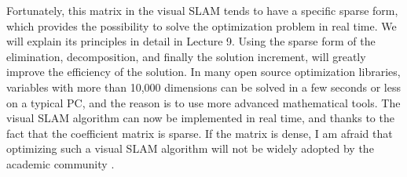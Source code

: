 Fortunately, this matrix in the visual SLAM tends to have a specific sparse form, which provides the possibility to solve the optimization problem in real time. We will explain its principles in detail in Lecture 9. Using the sparse form of the elimination, decomposition, and finally the solution increment, will greatly improve the efficiency of the solution. In many open source optimization libraries, variables with more than 10,000 dimensions can be solved in a few seconds or less on a typical PC, and the reason is to use more advanced mathematical tools. The visual SLAM algorithm can now be implemented in real time, and thanks to the fact that the coefficient matrix is sparse. If the matrix is dense, I am afraid that optimizing such a visual SLAM algorithm will not be widely adopted by the academic community \textsuperscript{\cite{Lourakis2009, Sibley2009a, Triggs2000 }}.
